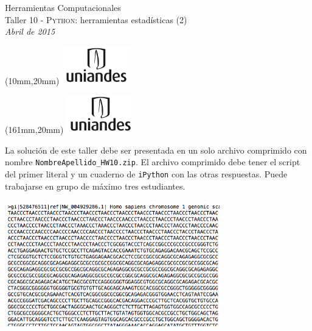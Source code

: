 \documentclass[11pt,letterpaper]{exam}
\begin{document}
\begin{center}
{\Large Herramientas Computacionales} \\
Taller 10 - \textsc{Python}: herramientas estadísticas (2) \\
{\small \it Abril de 2015}
\end{center}

\begin{textblock*}{40mm}(10mm,20mm)
  \includegraphics[width=3cm]{logoUniandes.pdf}
\end{textblock*}

\begin{textblock*}{40mm}(161mm,20mm)
  \includegraphics[width=3cm]{logoUniandes.pdf}
\end{textblock*}

\vspace{1cm}

La solución de este taller debe ser presentada en un solo archivo comprimido con nombre \verb+NombreApellido_HW10.zip+. El archivo comprimido debe tener el script del primer literal y un cuaderno de \verb+iPython+ con las otras respuestas. Puede trabajarse en grupo de máximo tres estudiantes.

\begin{center}
	\includegraphics[width=0.7\textwidth]{./cromo.png}
\end{center}
\end{document}
